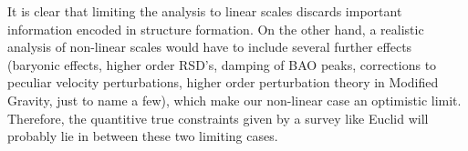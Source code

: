 It is clear that limiting the analysis to linear scales discards important information encoded in structure formation. On the other hand, a realistic analysis of non-linear scales would have to include several further effects (baryonic effects, higher order RSD's, damping of BAO peaks, corrections
to peculiar velocity perturbations, higher order perturbation theory in Modified Gravity, just to name a few), which make our non-linear case an optimistic limit.
Therefore, the quantitive true constraints given by a survey like Euclid will probably lie in between these two limiting cases. 









  


